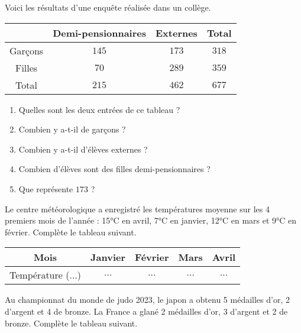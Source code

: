 \begin{pageAD} 



Voici les résultats d'une enquête réalisée dans un collège.

 \begin{center}
 \begin{tabular}{|c|c|c|c|}\hline 
  & Demi-pensionnaires & Externes & Total \\\hline 
  Garçons & $145$ & $173$ & $318$ \\\hline
  Filles & $70$ & $289$ & $359$ \\\hline
  Total & $215$ & $462$ & $677$ \\\hline 
 \end{tabular}
 \end{center}
 
 \begin{enumerate}
 \item Quelles sont les deux entrées de ce tableau ? 
 \item Combien y a-t-il de garçons ? 
 \item Combien y a-t-il d'élèves externes ? 
 \item Combien d'élèves sont des filles demi-pensionnaires ?  
 \item Que représente $173$ ?  
\end{enumerate}



Le centre météorologique a enregistré les températures moyenne sur les 4 premiers mois de l'année : 15°C en avril, 7°C en janvier, 12°C en mars et 9°C en février. Complète le tableau suivant.

 \begin{center}
 \begin{tabular}{|c|c|c|c|c|}\hline 
  Mois & Janvier & Février & Mars & Avril \\\hline 
  Température ($\ldots$)& $\ldots$ & $\ldots$ & $\ldots$ & $\ldots$ \\\hline
 \end{tabular}
 \end{center}



Au championnat du monde de judo 2023, le japon a obtenu 5 médailles d'or, 2 d'argent et 4 de bronze. La France a glané 2 médailles d'or, 3 d'argent et 2 de bronze. Complète le tableau suivant.


\end{pageAD}

